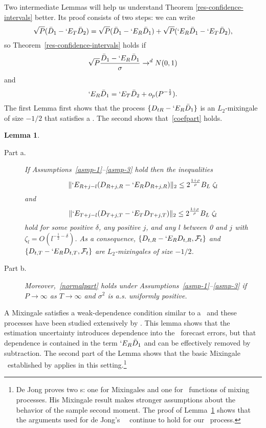 \documentclass[11pt]{article}
\newtheorem{lem}[thm]{Lemma}
\newcommand{\E}{`E}
\newcommand{\couplingConstant}{\ensuremath{2^{\frac{1+\rho}{\rho}} B_L}}
\begin{document}
Two intermediate Lemmas will help us understand Theorem
\ref{res-confidence-intervals} better.  Its proof consists of two
steps: we can write
\begin{equation}
  \sqrt{P} (\bar{D}_1 - \E_T \bar{D}_2) = \sqrt{P} (\bar{D}_1 - \E_R
  \bar{D}_1) + \sqrt{P} (\E_R \bar{D}_1 - \E_T \bar{D}_2),
\end{equation}
so Theorem~\ref{res-confidence-intervals} holds if
\begin{equation}\label{normalpart}
  \sqrt{P}\frac{\bar{D}_1 - \E_R \bar{D}_1}{\sigma} \to^d N(0,1)
\end{equation}
and
\begin{equation}\label{coefpart}
  \E_R \bar{D}_1 = \E_T \bar{D}_2 + o_p(P^{-\frac12}).
\end{equation}
The first Lemma first shows that the process $\{D_{tR} - \E_R \bar
D_1\}$ is an $L_2$-mixingale of size $-1/2$ that satisfies a \clt.
The second shows that~\eqref{coefpart} holds.

\begin{lem}\label{res-mixingale}
  \begin{description}
  \item[Part a.]   If Assumptions~\ref{asmp-1}--\ref{asmp-3} hold then the inequalities 
  \begin{equation}\label{mixingaleR}
    \lVert \E_{R+j-l}(D_{R+j,R} - \E_R D_{R+j,R}) \rVert_2 \leq
    \couplingConstant \;
    \zeta_l
  \end{equation}
  and
  \begin{equation}\label{mixingaleT}
    \lVert \E_{T+j-l}(D_{T+j,T} - \E_T D_{T+j,T}) \rVert_2 \leq  \couplingConstant \;
    \zeta_l
  \end{equation}
  hold for some positive $\delta$, any positive $j$, and any $l$
  between 0 and $j$ with $\zeta_l = O(l^{-\frac12 - \delta})$.  As a
  consequence, $\{D_{t,R} - \E_R D_{t,R}, \mathcal F_t\}$ and
  $\{D_{t,T} - \E_R D_{t,T}, \mathcal F_t\}$ are $L_2$-mixingales of
  size $-1/2$.
  \item[Part b.] Moreover,~\eqref{normalpart} holds under
    Assumptions~\ref{asmp-1}--\ref{asmp-3} if $P \to \infty$ as $T
    \to \infty$ and $\sigma^2$ is a.s. uniformly positive.
  \end{description}
\end{lem}

A Mixingale satisfies a weak-dependence condition similar to a \mds\ and
these processes have been studied extensively by
\citet{mcleish_dependent_1974,mcleish_invariance_1975,mcleish_maximal_1975,mcleish_invariance_1977}.
This lemma shows that the estimation uncertainty introduces dependence
into the \oos\ forecast errors, but that dependence is contained in
the term $\E_R \bar D_1$ and can be effectively removed by
subtraction.  The second part of the Lemma shows that the basic
Mixingale \clt\ established by \citet{de_jong_central_1997} applies in
this setting.\footnote{De Jong proves two \clt s: one for Mixingales
  and one for \ned\ functions of mixing processes.  His Mixingale
  result makes stronger assumptions about the behavior of the sample
  second moment.  The proof of Lemma~\ref{res-mixingale} shows that
  the arguments used for de Jong's \ned\ \clt\ continue to hold for
  our \oos\ process.}
\end{document}
